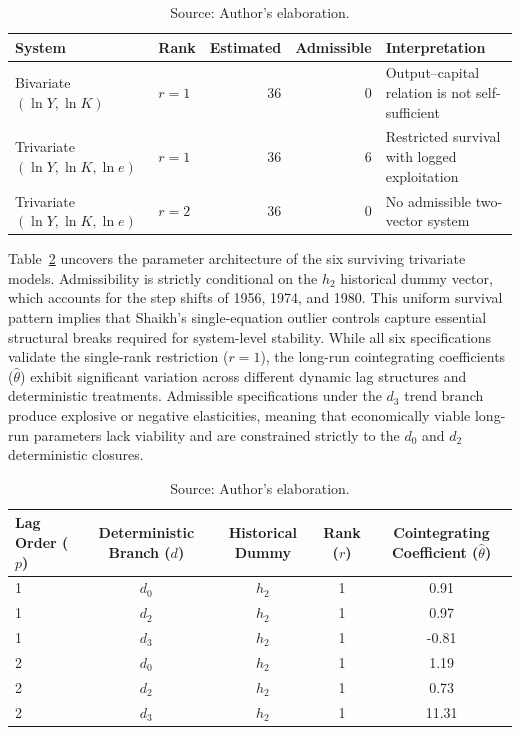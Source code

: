 \documentclass[11pt]{article}
\begin{document}
\begin{table}[H]
\centering
\caption{S2 System Admissibility Outcomes}
\label{tab:s2_admissibility_outcomes}
\small
\begin{tabular}{llrrp{5.0cm}}
\toprule
System & Rank & Estimated & Admissible & Interpretation \\
\midrule
\midrule
Bivariate $(\ln Y,\ln K)$ & $r=1$ & 36 & 0 & Output--capital relation is not self-sufficient \\
Trivariate $(\ln Y,\ln K,\ln e)$ & $r=1$ & 36 & 6 & Restricted survival with logged exploitation \\
Trivariate $(\ln Y,\ln K,\ln e)$ & $r=2$ & 36 & 0 & No admissible two-vector system \\
\bottomrule
\end{tabular}
\caption*{Source: Author's elaboration.}
\end{table}

Table~\ref{tab:s2_retained_trivariate_specs} uncovers the parameter architecture of the six surviving trivariate models. Admissibility is strictly conditional on the $h_2$ historical dummy vector, which accounts for the step shifts of 1956, 1974, and 1980. This uniform survival pattern implies that Shaikh’s single-equation outlier controls capture essential structural breaks required for system-level stability. While all six specifications validate the single-rank restriction ($r=1$), the long-run cointegrating coefficients ($\hat{\theta}$) exhibit significant variation across different dynamic lag structures and deterministic treatments. Admissible specifications under the $d_3$ trend branch produce explosive or negative elasticities, meaning that economically viable long-run parameters lack viability and are constrained strictly to the $d_0$ and $d_2$ deterministic closures.

\begin{table}[H]
\centering
\caption{S2 Retained Trivariate Specifications}
\label{tab:s2_retained_trivariate_specs}
\small
\begin{tabular}{lcccc}
\toprule
Lag Order ($p$) & Deterministic Branch ($d$) & Historical Dummy & Rank ($r$) & Cointegrating Coefficient ($\hat{\theta}$) \\
\midrule
\midrule
1 & $d_0$ & $h_2$ & 1 & 0.91 \\
1 & $d_2$ & $h_2$ & 1 & 0.97 \\
1 & $d_3$ & $h_2$ & 1 & -0.81 \\
2 & $d_0$ & $h_2$ & 1 & 1.19 \\
2 & $d_2$ & $h_2$ & 1 & 0.73 \\
2 & $d_3$ & $h_2$ & 1 & 11.31 \\
\bottomrule
\end{tabular}
\caption*{Source: Author's elaboration.}
\end{table}
\end{document}
